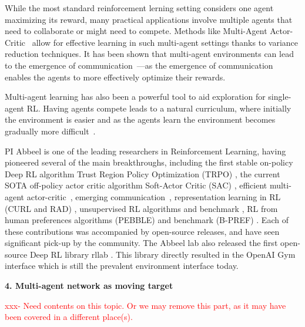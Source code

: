 \documentclass{NSF}
\begin{document}
While the most standard reinforcement lerning setting considers one agent maximizing its reward, many practical applications involve multiple agents that need to collaborate or might need to compete.
Methods like Multi-Agent Actor-Critic~\cite{lowe2017multiagent} allow for effective learning in such multi-agent settings thanks to variance reduction techniques.
It has been shown that multi-agent environments can lead to the emergence of communication~\cite{foerster2016learning, sukhbaatar2016learning, lazaridou2016multi, mordatch2017emergence}---as the emergence of communication enables the agents to more effectively optimize their rewards.

Multi-agent learning has also been a powerful tool to aid exploration for single-agent RL.
Having agents compete leads to a natural curriculum, where initially the environment is easier and as the agents learn the environment becomes gradually more difficult~\cite{sukhbaatar2017intrinsic,florensa2018automatic,racaniere2019automated,openai2021asymmetric,dennis2020emergent}.


PI Abbeel is one of the leading researchers in Reinforcement Learning, having pioneered several of the main breakthroughs, including the first stable on-policy Deep RL algorithm Trust Region Policy Optimization (TRPO) \cite{schulman2015trust}, the current SOTA off-policy actor critic algorithm Soft-Actor Critic (SAC) \cite{haarnoja2018soft}, efficient multi-agent actor-critic~\cite{lowe2017multiagent}, emerging communication~\cite{mordatch2017emergence}, representation learning in RL (CURL and RAD) \cite{misha20curl,RAD}, unsupervised RL algorithms and benchmark \cite{URLB}, RL from human preferences algorithms (PEBBLE) \cite{pebble} and benchmark (B-PREF) \cite{lee2021bpref}.
Each of these contributions was accompanied by open-source releases, and have seen significant pick-up by the community.
The Abbeel lab also released the first open-source Deep RL library rllab \cite{duan2016benchmarking}.
This library directly resulted in the OpenAI Gym interface \cite{openaigym} which is still the prevalent environment interface today.


\noindent \textbf{4. Multi-agent network as moving target}

\textcolor{red}{xxx- Need contents on this topic. Or we may remove this part, as it may have been covered in a different place(s). }



\newpage
\renewcommand\refname{References Cited}


\end{document}
